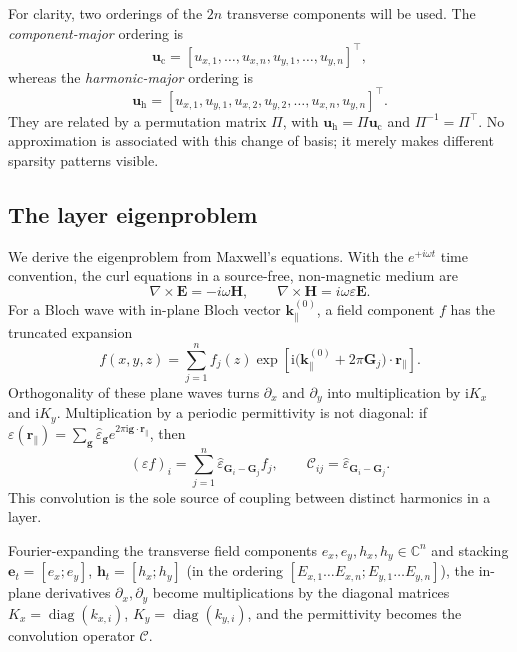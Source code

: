 \documentclass[11pt]{article}
\theoremstyle{remark}
\newcommand{\CC}{\mathbb{C}}
\newcommand{\eps}{\varepsilon}
\newcommand{\Cmat}{\mathcal{C}}
\DeclareMathOperator{\diag}{diag}
\newcommand{\ii}{\mathrm{i}}
\begin{document}
For clarity, two orderings of the $2n$ transverse components will be used.  The
\emph{component-major} ordering is
\begin{equation}
\mathbf{u}_{\mathrm{c}}=
[u_{x,1},\ldots,u_{x,n},u_{y,1},\ldots,u_{y,n}]^{\top},
\end{equation}
whereas the \emph{harmonic-major} ordering is
\begin{equation}
\mathbf{u}_{\mathrm{h}}=
[u_{x,1},u_{y,1},u_{x,2},u_{y,2},\ldots,u_{x,n},u_{y,n}]^{\top}.
\end{equation}
They are related by a permutation matrix $\Pi$, with
$\mathbf{u}_{\mathrm{h}}=\Pi\mathbf{u}_{\mathrm{c}}$ and
$\Pi^{-1}=\Pi^{\top}$.  No approximation is associated with this change of
basis; it merely makes different sparsity patterns visible.

\subsection{The layer eigenproblem}

We derive the eigenproblem from Maxwell's equations. With the $e^{+i\omega t}$
time convention, the curl equations in a source-free, non-magnetic medium are
\begin{equation}
\nabla\times\mathbf{E}=-i\omega\mathbf{H},\qquad
\nabla\times\mathbf{H}=i\omega\eps\mathbf{E}.
\label{eq:maxwell}
\end{equation}
For a Bloch wave with in-plane Bloch vector $\mathbf{k}_\parallel^{(0)}$, a
field component $f$ has the truncated expansion
\begin{equation}
f(x,y,z)=\sum_{j=1}^{n} f_j(z)
\exp\!\left[\ii\big(\mathbf{k}_\parallel^{(0)}+
2\pi\mathbf{G}_j\big)\cdot\mathbf{r}_\parallel\right].
\label{eq:bloch-expansion}
\end{equation}
Orthogonality of these plane waves turns $\partial_x$ and $\partial_y$ into
multiplication by $\ii K_x$ and $\ii K_y$.  Multiplication by a periodic
permittivity is not diagonal: if
$\eps(\mathbf{r}_\parallel)=\sum_{\mathbf{g}}\hat\eps_{\mathbf{g}}
e^{2\pi\ii\mathbf{g}\cdot\mathbf{r}_\parallel}$, then
\begin{equation}
(\eps f)_i=\sum_{j=1}^{n}
\hat\eps_{\mathbf{G}_i-\mathbf{G}_j}f_j,
\qquad
\Cmat_{ij}=\hat\eps_{\mathbf{G}_i-\mathbf{G}_j}.
\label{eq:convolution}
\end{equation}
This convolution is the sole source of coupling between distinct harmonics in
a layer.

Fourier-expanding the transverse field components
$e_x,e_y,h_x,h_y\in\CC^n$ and stacking
$\mathbf{e}_t=[e_x;e_y]$, $\mathbf{h}_t=[h_x;h_y]$ (in the ordering
$[E_{x,1}\dots E_{x,n};E_{y,1}\dots E_{y,n}]$), the in-plane derivatives
$\partial_x,\partial_y$ become multiplications by the diagonal matrices
$K_x=\diag(k_{x,i})$, $K_y=\diag(k_{y,i})$, and the permittivity becomes the
convolution operator $\Cmat$.
\end{document}
